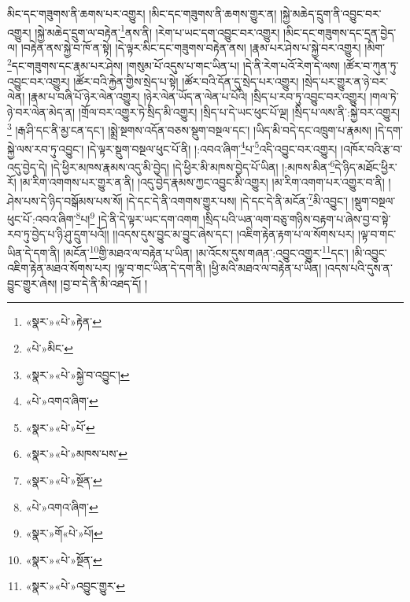 མིང་དང་གཟུགས་ནི་ཆགས་པར་འགྱུར། །མིང་དང་གཟུགས་ནི་ཆགས་གྱུར་ན། །སྐྱེ་མཆེད་དྲུག་ནི་འབྱུང་བར་འགྱུར། །སྐྱེ་མཆེད་དྲུག་ལ་བརྟེན་\footnote{«སྣར་»«པེ་»རྟེན་}ནས་ནི། །རེག་པ་ཡང་དག་འབྱུང་བར་འགྱུར། །མིང་དང་གཟུགས་དང་དྲན་བྱེད་ལ། །བརྟེན་ནས་སྐྱེ་བ་ཁོ་ན་སྟེ། །དེ་ལྟར་མིང་དང་གཟུགས་བརྟེན་ནས། །རྣམ་པར་ཤེས་པ་སྐྱེ་བར་འགྱུར། །མིག་\footnote{«པེ་»མིང་}དང་གཟུགས་དང་རྣམ་པར་ཤེས། །གསུམ་པོ་འདུས་པ་གང་ཡིན་པ། །དེ་ནི་རེག་པའོ་རེག་དེ་ལས། །ཚོར་བ་ཀུན་ཏུ་འབྱུང་བར་འགྱུར། །ཚོར་བའི་རྐྱེན་གྱིས་སྲེད་པ་སྟེ། །ཚོར་བའི་དོན་དུ་སྲེད་པར་འགྱུར། །སྲེད་པར་གྱུར་ན་ཉེ་བར་ལེན། །རྣམ་པ་བཞི་པོ་ཉེར་ལེན་འགྱུར། །ཉེར་ལེན་ཡོད་ན་ལེན་པ་པོའི། །སྲིད་པ་རབ་ཏུ་འབྱུང་བར་འགྱུར། །གལ་ཏེ་ཉེ་བར་ལེན་མེད་ན། །གྲོལ་བར་འགྱུར་ཏེ་སྲིད་མི་འགྱུར། །སྲིད་པ་དེ་ཡང་ཕུང་པོ་ལྔ། །སྲིད་པ་ལས་ནི་:སྐྱེ་བར་འགྱུར།\footnote{«སྣར་»«པེ་»སྐྱེ་བ་འབྱུང་།} །རྒ་ཤི་དང་ནི་མྱ་ངན་དང་། །སྨྲེ་སྔགས་འདོན་བཅས་སྡུག་བསྔལ་དང་། །ཡིད་མི་བདེ་དང་འཁྲུག་པ་རྣམས། །དེ་དག་སྐྱེ་ལས་རབ་ཏུ་འབྱུང་། །དེ་ལྟར་སྡུག་བསྔལ་ཕུང་པོ་ནི། །:འབའ་ཞིག་\footnote{«པེ་»འགའ་ཞིག་}པ་\footnote{«སྣར་»«པེ་»པོ་}འདི་འབྱུང་བར་འགྱུར། །འཁོར་བའི་རྩ་བ་འདུ་བྱེད་དེ། །དེ་ཕྱིར་མཁས་རྣམས་འདུ་མི་བྱེད། །དེ་ཕྱིར་མི་མཁས་བྱེད་པོ་ཡིན། །:མཁས་མིན་\footnote{«སྣར་»«པེ་»མཁས་པས་}དེ་ཉིད་མཐོང་ཕྱིར་རོ། །མ་རིག་འགགས་པར་གྱུར་ན་ནི། །འདུ་བྱེད་རྣམས་ཀྱང་འབྱུང་མི་འགྱུར། །མ་རིག་འགག་པར་འགྱུར་བ་ནི། །ཤེས་པས་དེ་ཉིད་བསྒོམས་པས་སོ། །དེ་དང་དེ་ནི་འགགས་གྱུར་པས། །དེ་དང་དེ་ནི་མངོན་\footnote{«སྣར་»«པེ་»སྔོན་}མི་འབྱུང་། །སྡུག་བསྔལ་ཕུང་པོ་:འབའ་ཞིག་\footnote{«པེ་»འགའ་ཞིག་}པ།\footnote{«སྣར་»གོ«པེ་»པོ།} །དེ་ནི་དེ་ལྟར་ཡང་དག་འགག །སྲིད་པའི་ཡན་ལག་བཅུ་གཉིས་བརྟག་པ་ཞེས་བྱ་བ་སྟེ་རབ་ཏུ་བྱེད་པ་ཉི་ཤུ་དྲུག་པའོ།། །།འདས་དུས་བྱུང་མ་བྱུང་ཞེས་དང་། །འཇིག་རྟེན་རྟག་པ་ལ་སོགས་པར། །ལྟ་བ་གང་ཡིན་དེ་དག་ནི། །མངོན་\footnote{«སྣར་»«པེ་»སྔོན་}གྱི་མཐའ་ལ་བརྟེན་པ་ཡིན། །མ་འོངས་དུས་གཞན་:འབྱུང་འགྱུར་\footnote{«སྣར་»«པེ་»འབྱུང་གྱུར་}དང་། །མི་འབྱུང་འཇིག་རྟེན་མཐའ་སོགས་པར། །ལྟ་བ་གང་ཡིན་དེ་དག་ནི། །ཕྱི་མའི་མཐའ་ལ་བརྟེན་པ་ཡིན། །འདས་པའི་དུས་ན་བྱུང་གྱུར་ཞེས། །བྱ་བ་དེ་ནི་མི་འཐད་དོ། །
